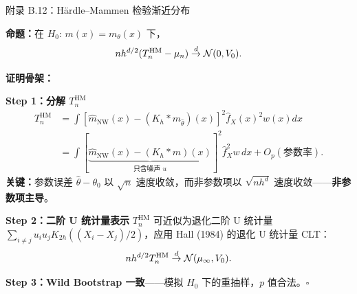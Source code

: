 \documentclass[aspectratio=169, 10pt]{beamer}
\begin{document}
\begin{frame}{附录 B.12：Härdle--Mammen 检验渐近分布}
  \hypertarget{proof-b12}{}

  \textbf{命题：}在 $H_0:\, m(x) = m_\theta(x)$ 下，
  \[
    nh^{d/2}(T_n^{\text{HM}} - \mu_n) \overset{d}{\to} \mathcal{N}(0, V_0).
  \]

  \textbf{证明骨架：}

  \textbf{Step 1：分解 $T_n^{\text{HM}}$}
  \begin{align*}
    T_n^{\text{HM}}
    &= \int [\hat m_{\text{NW}}(x) - (K_h * m_{\hat\theta})(x)]^2 \hat f_X(x)^2 w(x) dx \\
    &= \int [\underbrace{\hat m_{\text{NW}}(x) - (K_h * m)(x)}_{\text{只含噪声 }u}]^2 \hat f_X^2 w\, dx + O_p(\text{参数率}).
  \end{align*}
  \textbf{关键：}参数误差 $\hat\theta - \theta_0$ 以 $\sqrt{n}$ 速度收敛，而非参数项以 $\sqrt{nh^d}$ 速度收敛——\textbf{非参数项主导}。

  \textbf{Step 2：二阶 U 统计量表示}
  $T_n^{\text{HM}}$ 可近似为退化二阶 U 统计量 $\sum_{i\neq j} u_i u_j K_{2h}((X_i-X_j)/2)$，应用 Hall (1984) 的退化 U 统计量 CLT：
  \[
    nh^{d/2} T_n^{\text{HM}} \overset{d}{\to} \mathcal{N}(\mu_\infty, V_0).
  \]

  \textbf{Step 3：Wild Bootstrap 一致}——模拟 $H_0$ 下的重抽样，$p$ 值合法。$\square$

  \hfill{\scriptsize\hyperlink{main-b12}{}}
\end{frame}
\end{document}
